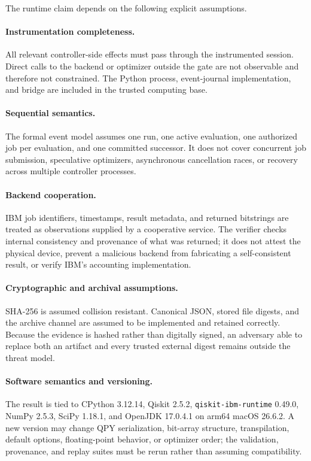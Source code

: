 The runtime claim depends on the following explicit assumptions.

\paragraph{Instrumentation completeness.}
All relevant controller-side effects must pass through the instrumented
session.  Direct calls to the backend or optimizer outside the gate are not
observable and therefore not constrained.  The Python process, event-journal
implementation, and bridge are included in the trusted computing base.

\paragraph{Sequential semantics.}
The formal event model assumes one run, one active evaluation, one authorized
job per evaluation, and one committed successor.  It does not cover concurrent
job submission, speculative optimizers, asynchronous cancellation races, or
recovery across multiple controller processes.

\paragraph{Backend cooperation.}
IBM job identifiers, timestamps, result metadata, and returned bitstrings are
treated as observations supplied by a cooperative service.  The verifier
checks internal consistency and provenance of what was returned; it does not
attest the physical device, prevent a malicious backend from fabricating a
self-consistent result, or verify IBM's accounting implementation.

\paragraph{Cryptographic and archival assumptions.}
SHA-256 is assumed collision resistant.  Canonical JSON, stored file digests,
and the archive channel are assumed to be implemented and retained correctly.
Because the evidence is hashed rather than digitally signed, an adversary able
to replace both an artifact and every trusted external digest remains outside
the threat model.

\paragraph{Software semantics and versioning.}
The result is tied to CPython 3.12.14, Qiskit 2.5.2,
\texttt{qiskit-ibm-runtime} 0.49.0, NumPy 2.5.3, SciPy 1.18.1, and OpenJDK
17.0.4.1 on arm64 macOS 26.6.2.  A new version may change QPY serialization,
bit-array structure, transpilation, default options, floating-point behavior,
or optimizer order; the validation, provenance, and replay suites must be
rerun rather than assuming compatibility.

